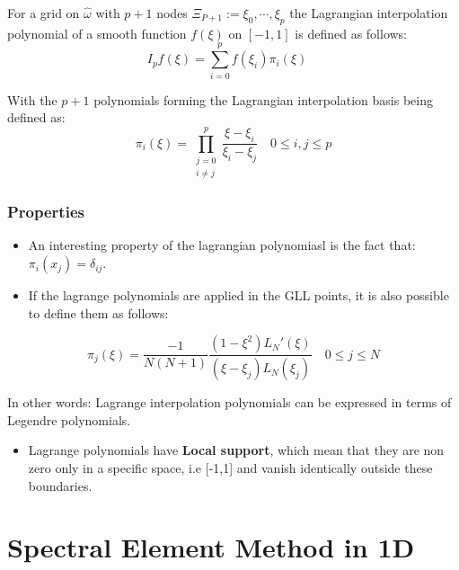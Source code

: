 \documentclass[
  a4paper,
  10pt]{article}
\providecommand{\tightlist}{%
  \setlength{\itemsep}{0pt}\setlength{\parskip}{0pt}}
\begin{document}
For a grid on \(\hat{\omega}\) with \(p+1\) nodes
\(\Xi_{P+1}:= {\xi_0,\cdots,\xi_p}\) the Lagrangian interpolation
polynomial of a smooth function \(f(\xi)\) on \([-1,1]\) is defined as
follows: \begin{equation}
I_pf(\xi) = \sum_{i=0}^{p} f(\xi_{i})\pi_i(\xi)  \quad
\end{equation}

With the \(p+1\) polynomials forming the Lagrangian interpolation basis
being defined as: \begin{equation}
\pi_i(\xi)  = \prod_{\substack{j=0\\i \neq j}}^p \frac{\xi - \xi_i}{\xi_i - \xi_j}  \quad 0 \leq i,j \leq p
\end{equation}

\hypertarget{properties-1}{%
\subsubsection{Properties}\label{properties-1}}

\begin{itemize}
\item
  An interesting property of the lagrangian polynomiasl is the fact
  that: \(\pi_i(x_j)=\delta_{ij}\).
\item
  If the lagrange polynomials are applied in the GLL points, it is also
  possible to define them as follows:
\end{itemize}

\begin{equation}
    \pi_j(\xi) = \frac{-1}{N(N+1)} \frac{(1-{\xi}^2)L_N'(\xi)}{(\xi-\xi_j)L_N(\xi_j)}  \quad 0 \leq j \leq N 
\end{equation}

In other words: Lagrange interpolation polynomials can be expressed in
terms of Legendre polynomials.

\begin{itemize}
\tightlist
\item
  Lagrange polynomials have \textbf{Local support}, which mean that they
  are non zero only in a specific space, i.e {[}-1,1{]} and vanish
  identically outside these boundaries.
\end{itemize}

\hypertarget{spectral-element-method-in-1d}{%
\section{Spectral Element Method in
1D}\label{spectral-element-method-in-1d}}
\end{document}
